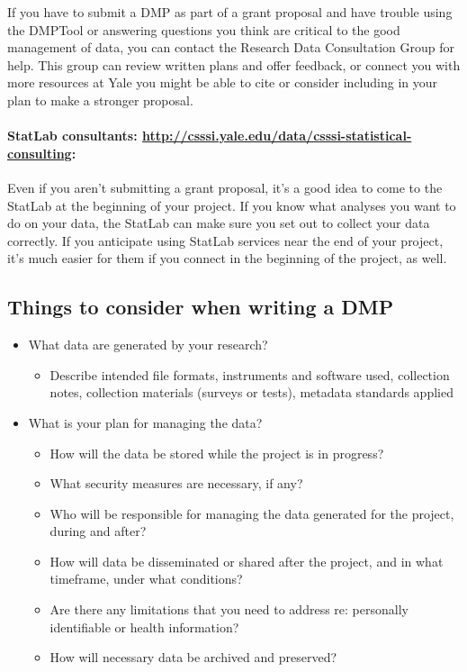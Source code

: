 If you have to submit a DMP as part of a grant proposal and have trouble
using the DMPTool or answering questions you think are critical to the
good management of data, you can contact the Research Data Consultation
Group for help. This group can review written plans and offer feedback,
or connect you with more resources at Yale you might be able to cite or
consider including in your plan to make a stronger proposal.

\paragraph{\texorpdfstring{StatLab consultants:
\url{http://csssi.yale.edu/data/csssi-statistical-consulting}:}{StatLab consultants: http://csssi.yale.edu/data/csssi-statistical-consulting:}}\label{statlab-consultants-httpcsssi.yale.edudatacsssi-statistical-consulting}

Even if you aren't submitting a grant proposal, it's a good idea to come
to the StatLab at the beginning of your project. If you know what
analyses you want to do on your data, the StatLab can make sure you set
out to collect your data correctly. If you anticipate using StatLab
services near the end of your project, it's much easier for them if you
connect in the beginning of the project, as well.

\subsection{Things to consider when writing a
DMP}\label{things-to-consider-when-writing-a-dmp}

\begin{itemize}
\tightlist
\item
  What data are generated by your research?

  \begin{itemize}
  \tightlist
  \item
    Describe intended file formats, instruments and software used,
    collection notes, collection materials (surveys or tests), metadata
    standards applied
  \end{itemize}
\item
  What is your plan for managing the data?

  \begin{itemize}
  \tightlist
  \item
    How will the data be stored while the project is in progress?
  \item
    What security measures are necessary, if any?
  \item
    Who will be responsible for managing the data generated for the
    project, during and after?
  \item
    How will data be disseminated or shared after the project, and in
    what timeframe, under what conditions?
  \item
    Are there any limitations that you need to address re: personally
    identifiable or health information?
  \item
    How will necessary data be archived and preserved?
  \end{itemize}
\end{itemize}

